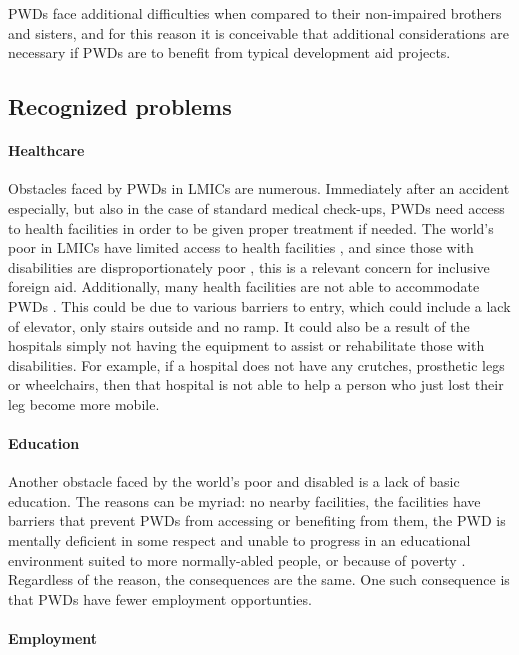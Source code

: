 \documentclass[a4paper]{article}
\begin{document}
PWDs face additional difficulties when compared to their non-impaired brothers
and sisters, and for this reason it is conceivable that additional
considerations are necessary if PWDs are to benefit from typical development
aid projects.


\subsection{Recognized problems}

\paragraph{Healthcare}

Obstacles faced by PWDs in LMICs  are numerous. Immediately after an accident
especially, but also in the case of standard medical check-ups, PWDs need
access to health facilities in order to be given proper treatment if needed.
The world's poor in LMICs have limited access to health facilities
\citep{peters2008poverty}, and since those with disabilities are
disproportionately poor \citep{mitra2018disability}, this is a relevant
concern for inclusive foreign aid.  Additionally, many health facilities are
not able to accommodate PWDs \citep{drainoni2006cross}. This could be due to
various barriers to entry, which could include a lack of elevator, only stairs
outside and no ramp. It could also be a result of the hospitals simply not
having the equipment to assist or rehabilitate those with disabilities. For
example, if a hospital does not have any crutches, prosthetic legs or
wheelchairs, then that hospital is not able to help a person who just lost
their leg become more mobile. 

\paragraph{Education}

Another obstacle faced by the world’s poor and disabled is a lack of basic
education. The reasons can be myriad: no nearby facilities, the facilities
have barriers that prevent PWDs from accessing or benefiting from them, the
PWD is mentally deficient in some respect and unable to progress in an
educational environment suited to more normally-abled people, or because of
poverty \citep{ingstad2011disability}. Regardless of the reason, the consequences are the
same. One such consequence is that PWDs have fewer employment opportunties.

\paragraph{Employment}
\end{document}
